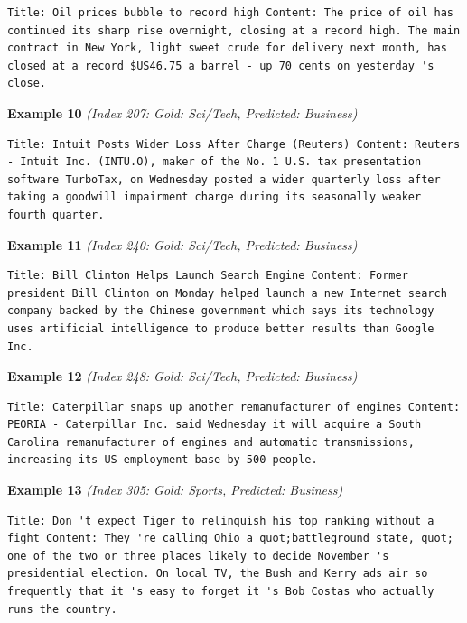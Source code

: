\begin{Verbatim}[breaklines=true,breakanywhere=true,fontsize=\small]
Title: Oil prices bubble to record high Content: The price of oil has continued its sharp rise overnight, closing at a record high. The main contract in New York, light sweet crude for delivery next month, has closed at a record $US46.75 a barrel - up 70 cents on yesterday 's close.
\end{Verbatim}

\noindent
\textbf{Example 10} \quad \textit{(Index 207: Gold: Sci/Tech, Predicted: Business)}

\begin{Verbatim}[breaklines=true,breakanywhere=true,fontsize=\small]
Title: Intuit Posts Wider Loss After Charge (Reuters) Content: Reuters - Intuit Inc. (INTU.O), maker of the No. 1 U.S. tax presentation software TurboTax, on Wednesday posted a wider quarterly loss after taking a goodwill impairment charge during its seasonally weaker fourth quarter.
\end{Verbatim}

\noindent
\textbf{Example 11} \quad \textit{(Index 240: Gold: Sci/Tech, Predicted: Business)}

\begin{Verbatim}[breaklines=true,breakanywhere=true,fontsize=\small]
Title: Bill Clinton Helps Launch Search Engine Content: Former president Bill Clinton on Monday helped launch a new Internet search company backed by the Chinese government which says its technology uses artificial intelligence to produce better results than Google Inc.
\end{Verbatim}

\noindent
\textbf{Example 12} \quad \textit{(Index 248: Gold: Sci/Tech, Predicted: Business)}

\begin{Verbatim}[breaklines=true,breakanywhere=true,fontsize=\small]
Title: Caterpillar snaps up another remanufacturer of engines Content: PEORIA - Caterpillar Inc. said Wednesday it will acquire a South Carolina remanufacturer of engines and automatic transmissions, increasing its US employment base by 500 people.
\end{Verbatim}

\noindent
\textbf{Example 13} \quad \textit{(Index 305: Gold: Sports, Predicted: Business)}

\begin{Verbatim}[breaklines=true,breakanywhere=true,fontsize=\small]
Title: Don 't expect Tiger to relinquish his top ranking without a fight Content: They 're calling Ohio a quot;battleground state, quot; one of the two or three places likely to decide November 's presidential election. On local TV, the Bush and Kerry ads air so frequently that it 's easy to forget it 's Bob Costas who actually runs the country.
\end{Verbatim}

